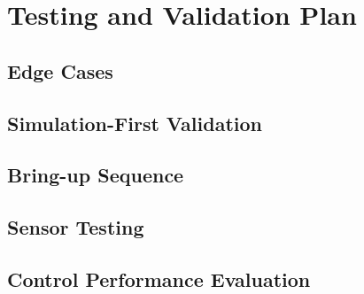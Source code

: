 \section{Testing and Validation Plan}

\subsection{Edge Cases}

\subsection{Simulation-First Validation}

\subsection{Bring-up Sequence}

\subsection{Sensor Testing}

\subsection{Control Performance Evaluation}
